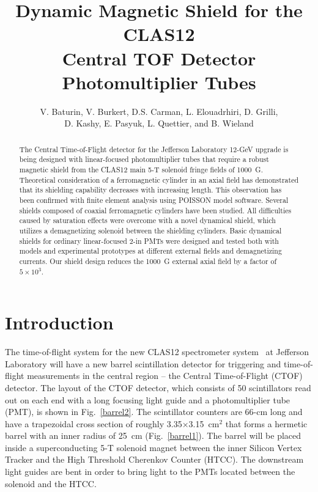 \documentclass[12pt]{article}
\begin{document}
\title{Dynamic Magnetic Shield for the CLAS12 \\
Central TOF Detector Photomultiplier Tubes}

\author{V. Baturin, V. Burkert, D.S. Carman, L. Elouadrhiri, D. Grilli,\\
D. Kashy, E. Pasyuk, L. Quettier, and B. Wieland}

\maketitle

\begin{abstract}
The Central Time-of-Flight detector for the Jefferson Laboratory 12-GeV upgrade is 
being designed with linear-focused photomultiplier tubes that require a robust 
magnetic shield from the CLAS12 main 5-T solenoid fringe fields of 1000~G. 
Theoretical consideration of a ferromagnetic cylinder in an axial field has 
demonstrated that its shielding capability decreases with increasing length. This 
observation has been confirmed with finite element analysis using POISSON model 
software. Several shields composed of coaxial ferromagnetic cylinders have been 
studied. All difficulties caused by saturation effects were overcome with a novel 
dynamical shield, which utilizes a demagnetizing solenoid between the shielding 
cylinders. Basic dynamical shields for ordinary linear-focused 2-in PMTs were 
designed and tested both with models and experimental prototypes at different external 
fields and demagnetizing currents. Our shield design reduces the 1000~G external 
axial field by a factor of $5\times10^3$. 
\end{abstract}
%
\section{Introduction}
The time-of-flight system for the new CLAS12 spectrometer system~\cite{clas12} at
Jefferson Laboratory will have a new barrel scintillation detector for triggering 
and time-of-flight measurements in the central region -- the Central Time-of-Flight 
(CTOF) detector. The layout of the CTOF detector, which consists of 50 scintillators 
read out on each end with a long focusing light guide and a photomultiplier tube 
(PMT), is shown in Fig.~\ref{barrel2}. The scintillator counters are 66-cm long and
have a trapezoidal cross section of roughly 3.35$\times$3.15~cm$^2$ that forms a 
hermetic barrel with an inner radius of 25~cm (Fig.~\ref{barrel1}). The barrel will 
be placed inside a superconducting 5-T solenoid magnet between the inner Silicon 
Vertex Tracker and the High Threshold Cherenkov Counter (HTCC). The downstream light 
guides are bent in order to bring light to the PMTs located between the solenoid and 
the HTCC.
\end{document}
